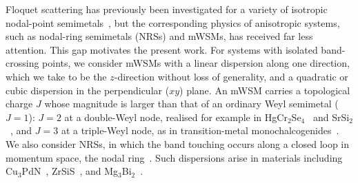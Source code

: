 \documentclass[aps,prb,onecolumn,longbibliography,nofootinbib,citeautoscript,10pt]{revtex4-2}
\begin{document}
Floquet scattering has previously been investigated for a variety of isotropic nodal-point semimetals~\cite{Zhu15,reichl199, Dai2014, Zhu17, bera2021, bera2023},  but the corresponding physics of anisotropic systems, such as nodal-ring semimetals (NRSs) and mWSMs, has received far less attention. This gap motivates the present work. For systems with isolated band-crossing points, we consider mWSMs with a linear dispersion along one direction, which we take to be the $z$-direction without loss of generality, and a quadratic or cubic dispersion in the perpendicular ($xy$) plane. An mWSM carries a topological charge $J$ whose magnitude is larger than that of an ordinary Weyl semimetal ($J = 1$): $J = 2$ at a double-Weyl node, realised for example in HgCr$_2$Se$_4$~\cite{Gang2011} and SrSi$_2$~\cite{hasan_mweyl16}, and $J = 3$ at a triple-Weyl node, as in transition-metal monochalcogenides~\cite{liu2017predicted}. We also consider NRSs, in which the band touching occurs along a closed loop in momentum space, the nodal ring~\cite{Khokhlov2018, cheng-nodal, ips-nlsm-ph, ips-dipole-vnr}. Such dispersions arise in materials including Cu$_3$PdN~\cite{xiao_nodal15}, ZrSiS~\cite{fu_nodal19}, and Mg$_3$Bi$_2$~\cite{chang_nodal19}.
\end{document}
